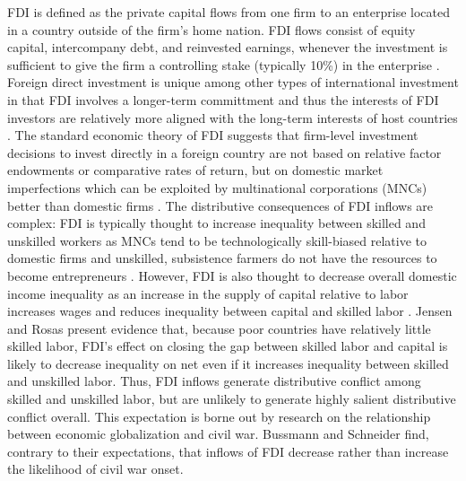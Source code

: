 \documentclass[a4paper]{article}\usepackage[]{graphicx}\usepackage[]{color}
\begin{document}
FDI is defined as the private capital flows from one firm to an enterprise located in a country outside of the firm's home nation. FDI flows consist of equity capital, intercompany debt, and reinvested earnings, whenever the investment is sufficient to give the firm a controlling stake (typically 10\%) in the enterprise \parencites[9]{DirectInvestmentTechnicalExpertGroupDITEG:2004wa}[588]{Jensen:2003to}. Foreign direct investment is unique among other types of international investment in that FDI involves a longer-term committment and thus the interests of FDI investors are relatively more aligned with the long-term interests of host countries \parencites{Lipsey:1999tn}[588]{Jensen:2003to}. The standard economic theory of FDI suggests that firm-level investment decisions to invest directly in a foreign country are not based on relative factor endowments or comparative rates of return, but on domestic market imperfections which can be exploited by multinational corporations (MNCs) better than domestic firms \parencites{Hymer:1960vo}{dunning2013international}. The distributive consequences of FDI inflows are complex: FDI is typically thought to increase inequality between skilled and unskilled workers as MNCs tend to be technologically skill-biased relative to domestic firms \parencite{Feenstra:1997kx} and unskilled, subsistence farmers do not have the resources to become entrepreneurs \parencite{Basu:2007ir}. However, FDI is also thought to decrease overall domestic income inequality as an increase in the supply of capital relative to labor increases wages and reduces inequality between capital and skilled labor \parencite{Jensen:2007fr}. Jensen and Rosas present evidence that, because poor countries have relatively little skilled labor, FDI's effect on closing the gap between skilled labor and capital is likely to decrease inequality on net even if it increases inequality between skilled and unskilled labor. Thus, FDI inflows generate distributive conflict among skilled and unskilled labor, but are unlikely to generate highly salient distributive conflict overall. This expectation is borne out by research on the relationship between economic globalization and civil war. Bussmann and Schneider \parencite*{Bussmann:2007vx} find, contrary to their expectations, that inflows of FDI decrease rather than increase the likelihood of civil war onset.
\end{document}

